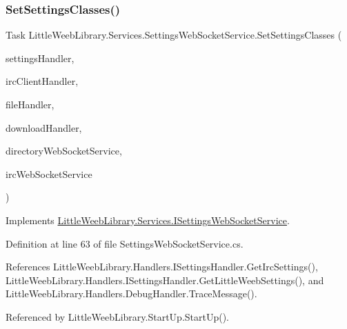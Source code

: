 \subsubsection{\texorpdfstring{Set\+Settings\+Classes()}{SetSettingsClasses()}}
{\footnotesize\ttfamily Task Little\+Weeb\+Library.\+Services.\+Settings\+Web\+Socket\+Service.\+Set\+Settings\+Classes (\begin{DoxyParamCaption}\item[{\mbox{\hyperlink{interface_little_weeb_library_1_1_handlers_1_1_i_settings_handler}{I\+Settings\+Handler}}}]{settings\+Handler,  }\item[{\mbox{\hyperlink{interface_little_weeb_library_1_1_handlers_1_1_i_irc_client_handler}{I\+Irc\+Client\+Handler}}}]{irc\+Client\+Handler,  }\item[{\mbox{\hyperlink{interface_little_weeb_library_1_1_handlers_1_1_i_file_handler}{I\+File\+Handler}}}]{file\+Handler,  }\item[{\mbox{\hyperlink{interface_little_weeb_library_1_1_handlers_1_1_i_download_handler}{I\+Download\+Handler}}}]{download\+Handler,  }\item[{\mbox{\hyperlink{interface_little_weeb_library_1_1_services_1_1_i_directory_web_socket_service}{I\+Directory\+Web\+Socket\+Service}}}]{directory\+Web\+Socket\+Service,  }\item[{\mbox{\hyperlink{interface_little_weeb_library_1_1_services_1_1_i_irc_web_socket_service}{I\+Irc\+Web\+Socket\+Service}}}]{irc\+Web\+Socket\+Service }\end{DoxyParamCaption})}



Implements \mbox{\hyperlink{interface_little_weeb_library_1_1_services_1_1_i_settings_web_socket_service_a84507a02937d9fbfb1edb25251ec7f90}{Little\+Weeb\+Library.\+Services.\+I\+Settings\+Web\+Socket\+Service}}.



Definition at line 63 of file Settings\+Web\+Socket\+Service.\+cs.



References Little\+Weeb\+Library.\+Handlers.\+I\+Settings\+Handler.\+Get\+Irc\+Settings(), Little\+Weeb\+Library.\+Handlers.\+I\+Settings\+Handler.\+Get\+Little\+Weeb\+Settings(), and Little\+Weeb\+Library.\+Handlers.\+Debug\+Handler.\+Trace\+Message().



Referenced by Little\+Weeb\+Library.\+Start\+Up.\+Start\+Up().


